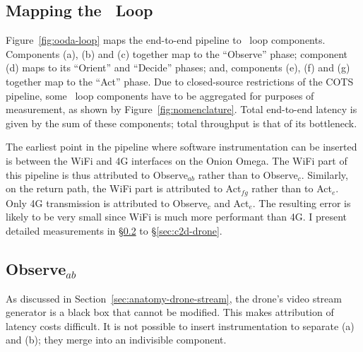 \subsection{Mapping the \ooda~Loop}
\label{sec:mapping}

Figure~\ref{fig:ooda-loop} maps the end-to-end pipeline to \ooda~loop
components.  Components (a), (b) and (c) together map to the
``Observe'' phase; component (d) maps to its ``Orient'' and
``Decide'' phases; and, components (e), (f) and (g) together map to
the ``Act'' phase.  Due to closed-source restrictions of the COTS
pipeline, some \ooda~loop components have to be aggregated for
purposes of measurement, as shown by Figure~\ref{fig:nomenclature}.
Total end-to-end latency is given by the sum of these components;
total throughput is that of its bottleneck.

The earliest point in the pipeline where software instrumentation can
be inserted is between the WiFi and 4G interfaces on the Onion
Omega.  The WiFi part of this pipeline is thus attributed to
Observe$_{ab}$ rather than to Observe$_{c}$.  Similarly, on the return
path, the WiFi part is attributed to Act$_{fg}$ rather than to
Act$_{e}$. Only 4G transmission is attributed to Observe$_{c}$ and
Act$_{e}$.  The resulting error is likely to be very small since WiFi
is much more performant than 4G.  I present detailed
measurements in \S\ref{sec:d2c-drone} to \S\ref{sec:c2d-drone}.


\subsection{Observe$_{ab}$}
\label{sec:d2c-drone}

As discussed in Section~\ref{sec:anatomy-drone-stream}, the drone's video stream generator is a black box that cannot be modified. This makes attribution of latency costs difficult.  It is not possible to insert instrumentation to separate (a) and (b); they merge into an indivisible component.

